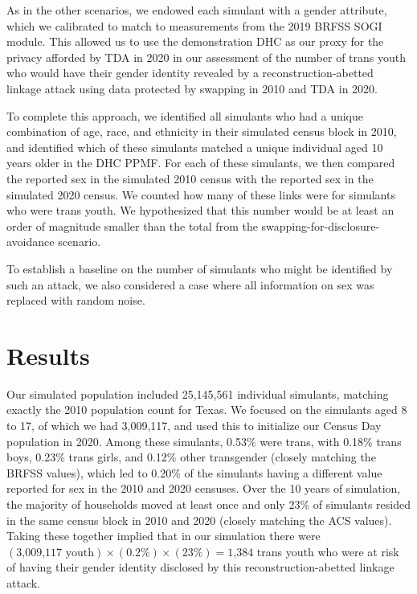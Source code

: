 \documentclass{jpc} %
\theoremstyle{plain}\newtheorem{satz}[thm]{Satz} %
\begin{document}
As in the other scenarios, we endowed each simulant with a gender attribute, which we calibrated to match to measurements from the 2019 BRFSS SOGI module. This allowed us to use the demonstration DHC as our proxy for the privacy afforded by TDA in 2020 in our assessment of the number of trans youth who would have their gender identity revealed by a reconstruction-abetted linkage attack using data protected by swapping in 2010 and TDA in 2020.

To complete this approach, we identified all simulants who had a unique combination of age, race, and ethnicity in their simulated census block in 2010, and identified which of these simulants matched a unique individual aged 10 years older in the DHC PPMF.  For each of these simulants, we then compared the reported sex in the simulated 2010 census with the reported sex in the simulated 2020 census. We counted how many of these links were for simulants who were trans youth.  We hypothesized that this number would be at least an order of magnitude smaller than the total from the swapping-for-disclosure-avoidance scenario.

To establish a baseline on the number of simulants who might be identified by such an attack, we also considered a case where all information on sex was replaced with random noise.

\section*{Results}

Our simulated population included 25,145,561 individual simulants, matching exactly the 2010 population count for Texas.  We focused on the simulants aged 8 to 17, of which we had 3,009,117, and used this to initialize our Census Day population in 2020.
Among these simulants, 0.53\% were trans, with 0.18\% trans boys, 0.23\% trans girls, and 0.12\% other transgender (closely matching the BRFSS values), which led to 0.20\% of the simulants having a different value reported for sex in the 2010 and 2020 censuses.
Over the 10 years of simulation, the majority of households moved at least once and only 23\% of simulants resided in the same census block in 2010 and 2020 (closely matching the ACS values).
Taking these together implied that in our simulation there were $(\text{3,009,117} \text{ youth}) \times (0.2\%) \times (23\%) = \text{1,384}$ trans youth who were at risk of having their gender identity disclosed by this reconstruction-abetted linkage attack.
\end{document}
